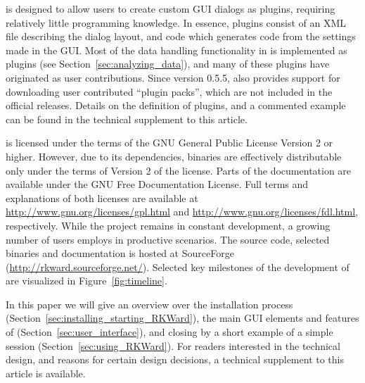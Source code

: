  is designed to allow users to create custom GUI dialogs as plugins, requiring relatively
little programming knowledge. In essence,  plugins consist of an XML file describing
the dialog layout, and  code which generates  code from the settings
made in the GUI. Most of the data handling functionality in  is implemented as plugins
(see Section~\ref{sec:analyzing_data}), and many of these plugins have originated as user contributions.
Since version 0.5.5,  also provides support for downloading user contributed ``plugin packs'',
which are not included in the official  releases. Details on the definition of plugins,
and a commented example can be found in the technical supplement to this article.

 is licensed under the terms of the GNU General Public License Version 2
or higher. However, due to its dependencies,  binaries are effectively
distributable only under the terms of Version 2 of the license. Parts of the documentation are available under the
GNU Free Documentation License. 
Full terms and explanations of both licenses are available at \url{http://www.gnu.org/licenses/gpl.html}
and \url{http://www.gnu.org/licenses/fdl.html}, respectively.
While the project remains in constant development, a growing
number of users employs  in productive scenarios. The source code,
selected binaries and documentation is hosted at SourceForge
(\url{http://rkward.sourceforge.net/}). Selected key milestones of the development of  are
visualized in Figure~\ref{fig:timeline}.

In this paper we will give an overview over the installation process (Section~\ref{sec:installing_starting_RKWard}), the main GUI elements and
features of  (Section~\ref{sec:user_interface}), and closing by a short example 
of a simple  session (Section~\ref{sec:using_RKWard}). For readers interested in the technical
design, and reasons for certain design decisions, a technical supplement to this article
is available.

